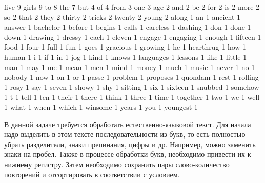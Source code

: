 \begin{myverbbox}[\small]{\voutput}
    five 9
    girls 9
    to 8
    the 7
    but 4
    of 4
    from 3
    one 3
    age 2
    and 2
    be 2
    for 2
    is 2
    more 2
    so 2
    that 2
    they 2
    thirty 2
    tricks 2
    twenty 2
    young 2
    along 1
    an 1
    ancient 1
    answer 1
    bachelor 1
    before 1
    begins 1
    calls 1
    careless 1
    dashing 1
    don 1
    done 1
    down 1
    drawing 1
    dressy 1
    each 1
    eleven 1
    engage 1
    engaging 1
    enough 1
    fifteen 1
    food 1
    four 1
    full 1
    fun 1
    goes 1
    gracious 1
    growing 1
    he 1
    hearthrug 1
    how 1
    human 1
    i 1
    if 1
    in 1
    jog 1
    kind 1
    knows 1
    languages 1
    lessons 1
    like 1
    little 1
    man 1
    may 1
    me 1
    mean 1
    men 1
    mind 1
    money 1
    much 1
    music 1
    never 1
    no 1
    nobody 1
    now 1
    on 1
    or 1
    passe 1
    problem 1
    proposes 1
    quondam 1
    rest 1
    rolling 1
    rosy 1
    say 1
    seven 1
    showy 1
    shy 1
    sitting 1
    six 1
    sixteen 1
    snubbed 1
    somehow 1
    t 1
    tell 1
    ten 1
    their 1
    there 1
    think 1
    three 1
    time 1
    together 1
    two 1
    we 1
    well 1
    what 1
    when 1
    which 1
    winsome 1
    years 1
    you 1
    youngest 1
\end{myverbbox}

\solutionSection

В данной задаче требуется обработать естественно-языковой текст. Для начала надо выделить в этом тексте последовательности из букв, то есть полностью убрать разделители, знаки препинания, цифры и др. Например, можно заменить знаки на пробел. Также в процессе обработки букв, необходимо привести их к нижнему регистру. Затем необходимо сохранить пары слово-количество повторений и отсортировать в соответствии с условием.

